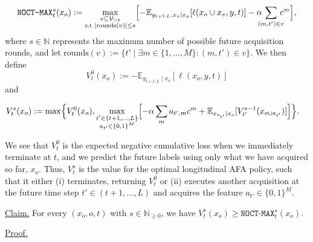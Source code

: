 \begin{equation*}
\texttt{NOCT-MAX}_t^s(x_o) := \max_{\substack{v\subseteq \mathcal{V}_{>t} \\ \text{s.t } \mid\text{rounds}(v) \mid \leq s} }
\Bigl[ - \mathbb{E}_{y_{t+1:L}, x_v \mid {x}_{o} }[\ell (x_o \cup x_v, y, t)] - \alpha \!\!\!\! \sum_{(m, t') \in v} \!\!\!\! c^m \Bigr],
\end{equation*} 
where $s \in \mathbb{N}$ represents the maximum number of possible future acquisition rounds, and let $\text{rounds}(v) := \{ t' \mid  \exists m \in \{1,\ldots,M\}:(m, t') \in v \}$. We then define 
\begin{equation*}
V_t^0(x_o) := -\mathbb{E}_{y_{t+1:L}\mid x_o}[\ell(x_o, y, t)] 
\end{equation*}
and 

\begin{align}
\label{eq:value_func}
V_t^s(x_o) &:=  \max \Bigl\{V_t^0 (x_o), \max_{\substack{t' \in \{t+1, ..., L\} \\ a_{t'} \in \{0,1\}^M}} \Bigl[ -\alpha \sum_{m} a_{t',m}c^m +\mathbb{E}_{x_{a_{t'}}\mid x_o} [ V^{s-1}_{t'} (x_{o \cup a_{t'}} ) ]  \Bigr] \Bigr\}.
\end{align}

We see that $V^{0}_{t}$ is the expected negative cumulative loss when we immediately terminate at $t$, and we predict the future labels using only what we have acquired so far, $x_o$. Thus, $V^{s}_{t}$ is the value for the optimal longitudinal AFA policy, such that it either (i) terminates, returning $V_t^0$ or (ii) executes another acquisition at the future time step $t' \in (t+1,...,L)$ and acquires the feature $a_{t'}\in \{0,1\}^M$. 

\uline{Claim.}
For every $(x_o, o, t)$ with $s \in \mathbb{N}_{\geq 0}$, we have $V_t^s(x_o) \geq \texttt{NOCT-MAX}^s_t(x_o)$.

\uline{Proof.}

